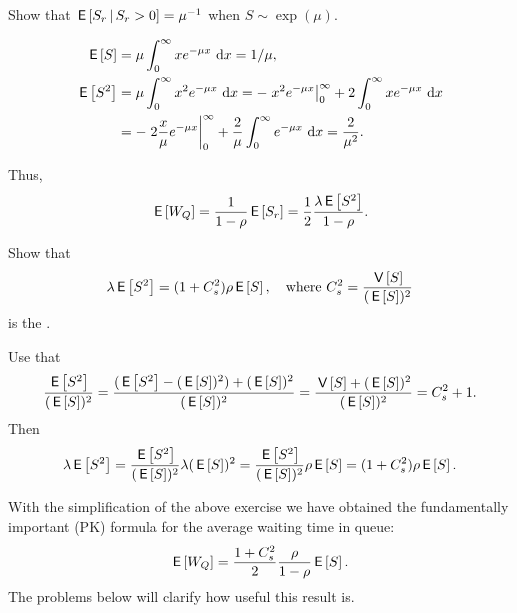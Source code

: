 \begin{exercise}
 Show that $\,\mathsf{E}\left[S_r\,\middle|\, S_r>0\right] = \mu^{-1}$ when $S\sim \exp(\mu)$.
\begin{solution}
    \begin{align*}
\,\mathsf{E}\left[S\right] &= \mu \int_0^\infty x e^{-\mu x}\,\,\text{d}x = 1/\mu, \\
\,\mathsf{E}\left[S^2\right] 
&= \mu \int_0^\infty x^2 e^{- \mu x} \,\,\text{d}x = - \left. x^2 e^{-\mu x} \right|_0^\infty + 2 \int_0^\infty x e^{-\mu x} \, \,\text{d}x \\
&= -\left. 2\frac x \mu e^{-\mu x} \right|_0^\infty + \frac 2 \mu\int_0^\infty e^{-\mu x} \, \,\text{d}x =\frac2{\mu^2}.
    \end{align*}
\end{solution}
\end{exercise}

Thus, 
\begin{equation*} 
  \,\mathsf{E}\left[W_Q\right] = \frac1{1-\rho} \,\mathsf{E}\left[S_r\right] =\frac 1 2 \frac{\lambda \,\mathsf{E}\left[S^2\right]}{1-\rho}.
\end{equation*}

\begin{exercise}
Show that
\begin{equation}\label{eq:32}
  \lambda \,\mathsf{E}\left[S^2\right] = (1+C_s^2)\rho\,\mathsf{E}\left[S\right], \quad\text{where }
 C_s^2 = \frac{\,\mathsf{V}\left[S\right] }{(\,\mathsf{E}\left[S\right])^2}
\end{equation}
is the .
\begin{solution}
Use that 
\begin{equation*}
  \frac{\,\mathsf{E}\left[S^2\right]}{(\,\mathsf{E}\left[S\right])^2} = 
  \frac{(\,\mathsf{E}\left[S^2\right]-(\,\mathsf{E}\left[S\right])^2) + (\,\mathsf{E}\left[S\right])^2}{(\,\mathsf{E}\left[S\right])^2} =
  \frac{\,\mathsf{V}\left[S\right] + (\,\mathsf{E}\left[S\right])^2}{(\,\mathsf{E}\left[S\right])^2} =
  C_s^2 + 1.
\end{equation*}
Then
\begin{equation*}
  \lambda\,\mathsf{E}\left[S^2\right] = \frac{\,\mathsf{E}\left[S^2\right]}{(\,\mathsf{E}\left[S\right])^2} \lambda(\,\mathsf{E}\left[S\right])^2=
 \frac{\,\mathsf{E}\left[S^2\right]}{(\,\mathsf{E}\left[S\right])^2} \rho \,\mathsf{E}\left[S\right] = (1+C_s^2) \rho \,\mathsf{E}\left[S\right].
\end{equation*}
\end{solution}
\end{exercise}

With the simplification of the above exercise  we have obtained the fundamentally important  (PK) formula for the average waiting time in queue:
\begin{equation} \label{eq:710}
  \,\mathsf{E}\left[W_Q\right] =\frac{1 + C_s^2}2 \frac{\rho}{1-\rho}  \,\mathsf{E}\left[S\right].
\end{equation}
The problems below will clarify how useful this result is.

